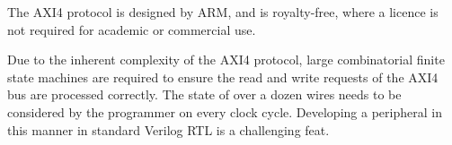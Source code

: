 \documentclass[a4paper,8pt]{report}
\begin{document}
The AXI4 protocol is designed by ARM, and is royalty-free, where a licence is
not required for academic or commercial use.




Due to the inherent complexity of the AXI4 protocol, large combinatorial finite
state machines are required to ensure the read and write requests of the AXI4
bus are processed correctly.
The state of over a dozen wires needs to be considered by the programmer on
every clock cycle. Developing a peripheral in this manner in standard Verilog
RTL is a challenging feat.
\end{document}
